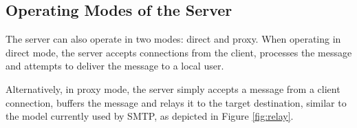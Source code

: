 \subsection{Operating Modes of the Server}

The server can also operate in two modes: direct and proxy. When
operating in direct mode, the server accepts connections from the 
client, processes the message and attempts to deliver the message to a 
local user.


Alternatively, in proxy mode, the server simply accepts a message from a
client connection, buffers the message and relays it to the target 
destination, similar to the model currently used by SMTP, as depicted in
Figure \ref{fig:relay}.

\pagebreak



